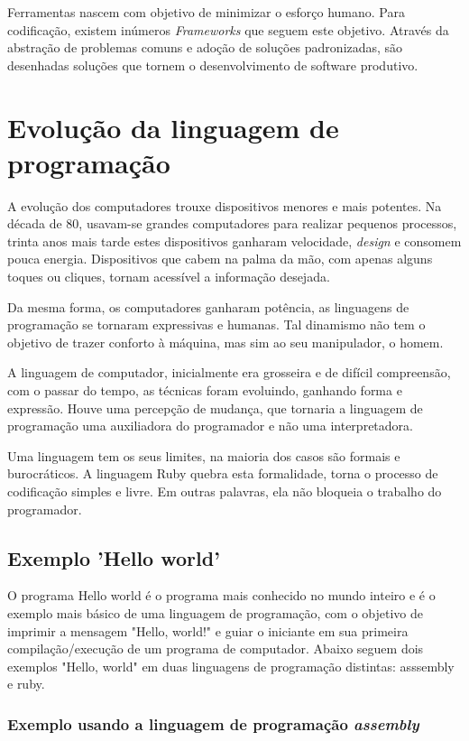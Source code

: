 \documentclass[espaco=simples,appendix=Name]{abnt}
\begin{document}
Ferramentas nascem com objetivo de minimizar o esforço humano. Para codificação, existem inúmeros \textit{Frameworks} que seguem este objetivo. Através da abstração de problemas comuns e adoção de soluções padronizadas, são desenhadas soluções que tornem o desenvolvimento de software produtivo.


\chapter{Evolução da linguagem de programação}

A evolução dos computadores trouxe dispositivos menores e mais potentes. Na década de 80, usavam-se grandes computadores para realizar pequenos processos, trinta anos mais tarde estes dispositivos ganharam velocidade, \textit{design} e consomem pouca energia. Dispositivos que cabem na palma da mão, com apenas alguns toques ou cliques, tornam acessível a informação desejada. 

Da mesma forma, os computadores ganharam potência, as linguagens de programação se tornaram expressivas e humanas. Tal dinamismo não tem o objetivo de trazer conforto à máquina, mas sim ao seu manipulador, o homem. 

A linguagem de computador, inicialmente era grosseira e de difícil compreensão, com o passar do tempo, as técnicas foram evoluindo, ganhando forma e expressão. Houve uma percepção de mudança, que tornaria a linguagem de programação uma auxiliadora do programador e não uma interpretadora.

Uma linguagem tem os seus limites, na maioria dos casos são formais e burocráticos. A linguagem Ruby quebra esta formalidade, torna o processo de codificação simples e livre. Em outras palavras, ela não bloqueia o trabalho do programador.

\section{Exemplo 'Hello world'}

   O programa Hello world é o programa mais conhecido no mundo inteiro e é o exemplo mais básico de uma linguagem de programação, com o objetivo de imprimir a mensagem "Hello, world!" e guiar o iniciante em sua primeira compilação/execução de um programa de computador. Abaixo seguem dois exemplos "Hello, world" em duas linguagens de programação distintas: asssembly e ruby.


\subsection {Exemplo usando a linguagem de programação \textit{assembly}}
\end{document}
